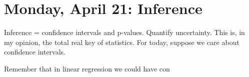 \section{Monday, April 21: Inference}

Inference = confidence intervals and p-values. Quantify uncertainty. This is, in my opinion, the total real key of statistics. For today, suppose we care about confidence intervals. 

Remember that in linear regression we could have con